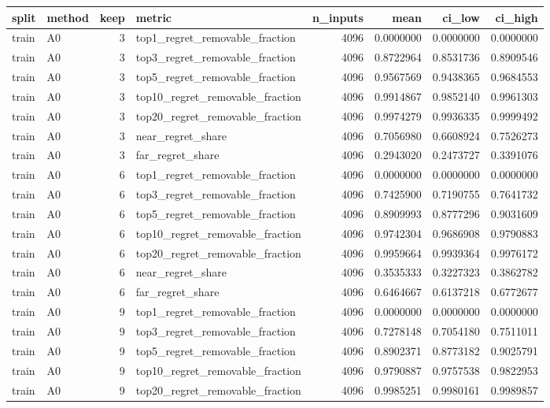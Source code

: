 \begin{tabular}{llrlrrrr}
\toprule
split & method & keep & metric & n_inputs & mean & ci_low & ci_high \\
\midrule
train & A0 & 3 & top1_regret_removable_fraction & 4096 & 0.0000000 & 0.0000000 & 0.0000000 \\
train & A0 & 3 & top3_regret_removable_fraction & 4096 & 0.8722964 & 0.8531736 & 0.8909546 \\
train & A0 & 3 & top5_regret_removable_fraction & 4096 & 0.9567569 & 0.9438365 & 0.9684553 \\
train & A0 & 3 & top10_regret_removable_fraction & 4096 & 0.9914867 & 0.9852140 & 0.9961303 \\
train & A0 & 3 & top20_regret_removable_fraction & 4096 & 0.9974279 & 0.9936335 & 0.9999492 \\
train & A0 & 3 & near_regret_share & 4096 & 0.7056980 & 0.6608924 & 0.7526273 \\
train & A0 & 3 & far_regret_share & 4096 & 0.2943020 & 0.2473727 & 0.3391076 \\
train & A0 & 6 & top1_regret_removable_fraction & 4096 & 0.0000000 & 0.0000000 & 0.0000000 \\
train & A0 & 6 & top3_regret_removable_fraction & 4096 & 0.7425900 & 0.7190755 & 0.7641732 \\
train & A0 & 6 & top5_regret_removable_fraction & 4096 & 0.8909993 & 0.8777296 & 0.9031609 \\
train & A0 & 6 & top10_regret_removable_fraction & 4096 & 0.9742304 & 0.9686908 & 0.9790883 \\
train & A0 & 6 & top20_regret_removable_fraction & 4096 & 0.9959664 & 0.9939364 & 0.9976172 \\
train & A0 & 6 & near_regret_share & 4096 & 0.3535333 & 0.3227323 & 0.3862782 \\
train & A0 & 6 & far_regret_share & 4096 & 0.6464667 & 0.6137218 & 0.6772677 \\
train & A0 & 9 & top1_regret_removable_fraction & 4096 & 0.0000000 & 0.0000000 & 0.0000000 \\
train & A0 & 9 & top3_regret_removable_fraction & 4096 & 0.7278148 & 0.7054180 & 0.7511011 \\
train & A0 & 9 & top5_regret_removable_fraction & 4096 & 0.8902371 & 0.8773182 & 0.9025791 \\
train & A0 & 9 & top10_regret_removable_fraction & 4096 & 0.9790887 & 0.9757538 & 0.9822953 \\
train & A0 & 9 & top20_regret_removable_fraction & 4096 & 0.9985251 & 0.9980161 & 0.9989857 \\

\end{tabular}
